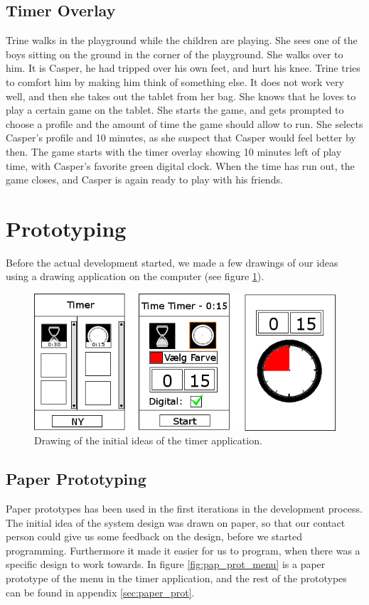 	\subsection*{Timer Overlay}
	Trine walks in the playground while the children are playing. She sees one of the boys sitting on the ground in the corner of the playground. She walks over to him. It is Casper, he had tripped over his own feet, and hurt his knee. Trine tries to comfort him by making him think of something else. It does not work very well, and then she takes out the tablet from her bag. She knows that he loves to play a certain game on the tablet. She starts the game, and gets prompted to choose a profile and the amount of time the game should allow to run. She selects Casper's profile and 10 minutes, as she suspect that Casper would feel better by then. The game starts with the timer overlay showing 10 minutes left of play time, with Casper's favorite green digital clock. When the time has run out, the game closes, and Casper is again ready to play with his friends.

\section{Prototyping}
Before the actual development started, we made a few drawings of our ideas using a drawing application on the computer (see figure \ref{fig:init_drawings}).

	\begin{figure}[H]
		\centering
			\includegraphics[width=\textwidth]{Images/paper_prototype/init_drawings.png}
				\caption{Drawing of the initial ideas of the timer application.}
		\label{fig:init_drawings}
	\end{figure}

	\subsection*{Paper Prototyping}
	Paper prototypes\cite{misc:designInterSys} has been used in the first iterations in the development process. The initial idea of the system design was drawn on paper, so that our contact person could give us some feedback on the design, before we started programming. Furthermore it made it easier for us to program, when there was a specific design to work towards. In figure \ref{fig:pap_prot_menu} is a paper prototype of the menu in the timer application, and the rest of the prototypes can be found in appendix \ref{sec:paper_prot}.

